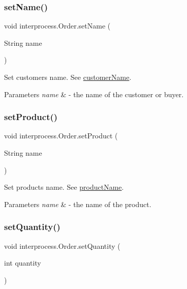 \subsubsection{\texorpdfstring{set\+Name()}{setName()}}
{\footnotesize\ttfamily void interprocess.\+Order.\+set\+Name (\begin{DoxyParamCaption}\item[{String}]{name }\end{DoxyParamCaption})\hspace{0.3cm}{\ttfamily [inline]}}

Set customer\textquotesingle{}s name. See \hyperlink{classinterprocess_1_1_order_a15fc1e10e5935f82493a68ebd9ef1a55}{customer\+Name}. 
\begin{DoxyParams}{Parameters}
{\em name} & -\/ the name of the customer or buyer. \\
\hline
\end{DoxyParams}
\mbox{\label{classinterprocess_1_1_order_a2c98ed99009d1303270a768bb3fdd4f4}} 
\subsubsection{\texorpdfstring{set\+Product()}{setProduct()}}
{\footnotesize\ttfamily void interprocess.\+Order.\+set\+Product (\begin{DoxyParamCaption}\item[{String}]{name }\end{DoxyParamCaption})\hspace{0.3cm}{\ttfamily [inline]}}

Set product\textquotesingle{}s name. See \hyperlink{classinterprocess_1_1_order_ab22f659fd57c8bde1b362e7054d63f61}{product\+Name}. 
\begin{DoxyParams}{Parameters}
{\em name} & -\/ the name of the product. \\
\hline
\end{DoxyParams}
\mbox{\label{classinterprocess_1_1_order_ae25cc04154fec8d5025154eca104f752}} 
\subsubsection{\texorpdfstring{set\+Quantity()}{setQuantity()}}
{\footnotesize\ttfamily void interprocess.\+Order.\+set\+Quantity (\begin{DoxyParamCaption}\item[{int}]{quantity }\end{DoxyParamCaption})\hspace{0.3cm}{\ttfamily [inline]}}


